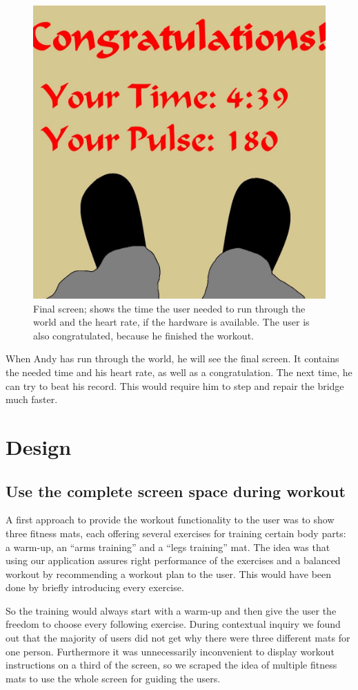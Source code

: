 \documentclass{sigchi}
\begin{document}
    \begin{figure}[htb]
      \centering
      \includegraphics[width=0.32\linewidth]{Image_17.jpg}
      \caption{Final screen; shows the time the user needed to run through the world and the heart rate, if the hardware is available. The user is also congratulated, because he finished the workout.}
      \label{fig:end}
    \end{figure}

    When Andy has run through the world, he will see the final screen. It contains the needed time and his heart rate, as well as a congratulation. The next time, he can try to beat his record. This would require him to step and repair the bridge much faster. 

\section{Design}

  \subsection{Use the complete screen space during workout} %
  \label{sub:use_the_complete_screen_space_during_workout}

    A first approach to provide the workout functionality to the user was to show three fitness mats, each offering several exercises for training certain body parts: a warm-up, an ``arms training'' and a ``legs training'' mat. The idea was that using our application assures right performance of the exercises and a balanced workout by recommending a workout plan to the user. This would have been done by briefly introducing every exercise. 

    So the training would always start with a warm-up and then give the user the freedom to choose every following exercise. During contextual inquiry we found out that the majority of users did not get why there were three different mats for one person. Furthermore it was unnecessarily inconvenient to display workout instructions on a third of the screen, so we scraped the idea of multiple fitness mats to use the whole screen for guiding the users.
\end{document}
